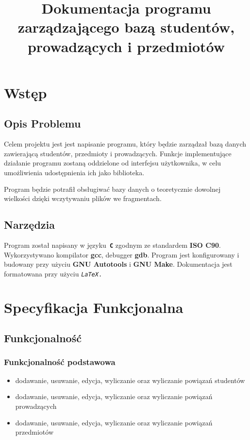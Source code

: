\documentclass[bibtotocnumbered, headsepline,normalheadings,12pt,polish]{scrreprt}
\begin{document}
\title{\textbf{Dokumentacja programu zarządzającego bazą studentów, prowadzących i przedmiotów}}
\date{}
\maketitle

\tableofcontents

\chapter{Wstęp}
\section{Opis Problemu}
\large
Celem projektu jest jest napisanie programu, który będzie zarządzał bazą danych zawierającą studentów, przedmioty i prowadzących. Funkcje implementujące działanie programu zostaną oddzielone od interfejsu użytkownika, w celu umożliwienia udostępnienia ich jako biblioteka.

Program będzie potrafił obsługiwać bazy danych o teoretycznie dowolnej wielkości dzięki wczytywaniu plików we fragmentach.

\section{Narzędzia}
\large
Program został napisany w języku\texttt{ \textbf{C}} zgodnym ze standardem \textbf{ISO C90}.
Wykorzystywano kompilator \textbf{gcc}, debugger \textbf{gdb}.
Program jest konfigurowany i budowany przy użyciu \textbf{GNU Autotools} i \textbf{GNU Make}.
Dokumentacja jest formatowana przy użyciu \texttt{\textit{LaTeX}.}

\chapter{Specyfikacja Funkcjonalna}
\section{Funkcjonalność}
\subsection{Funkcjonalność podstawowa}
\begin{itemize}
\item dodawanie, usuwanie, edycja, wyliczanie oraz wyliczanie powiązań studentów
\item dodawanie, usuwanie, edycja, wyliczanie oraz wyliczanie powiązań prowadzących
\item dodawanie, usuwanie, edycja, wyliczanie oraz wyliczanie powiązań przedmiotów
\end{itemize}
\end{document}
